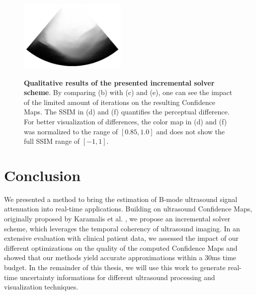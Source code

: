 \begin{figure}[p]
{		\includegraphics[width=0.46\textwidth]{figures/cudacm/evaluation/cm_stuff/329_256_110_cm.png}
	}
	\quad
	 \\
	\caption{
		\textbf{Qualitative results of the presented incremental solver scheme}.
		By comparing (b) with (c) and (e), one can see the impact of the limited amount of iterations on the resulting Confidence Maps.
		The SSIM in (d) and (f) quantifies the perceptual difference.
		For better visualization of differences, the color map in (d) and (f) was normalized to the range of $[0.85, 1.0]$ and does not show the full SSIM range of $[-1, 1]$.
	}
	\label{fig:cudacm:kidney-qualitative}
\end{figure}


\section{Conclusion}
We presented a method to bring the estimation of B-mode ultrasound signal attenuation into real-time applications.
Building on ultrasound Confidence Maps, originally proposed by Karamalis et al. \cite{Karamalis:2012:ConfidenceMaps}, we propose an incremental solver scheme, which leverages the temporal coherency of ultrasound imaging.
In an extensive evaluation with clinical patient data, we assessed the impact of our different optimizations on the quality of the computed Confidence Maps and showed that our methods yield accurate approximations within a $30$ms time budget.
In the remainder of this thesis, we will use this work to generate real-time uncertainty informations for different ultrasound processing and visualization techniques.
